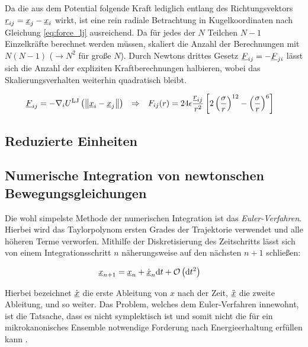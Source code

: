 		Da die aus dem Potential folgende Kraft lediglich entlang des Richtungsvektors
		$\underline{r}_{ij} = \underline{x}_j - \underline{x}_i$ wirkt, ist eine rein radiale Betrachtung in
		Kugelkoordinaten nach Gleichung \eqref{eq:force_lj} ausreichend. Da für jedes der $N$
		Teilchen $N-1$ Einzelkräfte berechnet werden müssen, skaliert die Anzahl der Berechnungen
		mit $N(N-1)$ ($\rightarrow N^2$ für große $N$). Durch Newtons drittes Gesetz
		$\underline{F}_{ij} = -\underline{F}_{ji}$ lässt sich die Anzahl der expliziten Kraftberechnungen
		halbieren, wobei das Skalierungsverhalten weiterhin quadratisch bleibt.

		\begin{align}
			\underline{F}_{ij} &= -\nabla_i U^\text{LJ}\left(
				\left\|\underline{x}_i - \underline{x}_j\right\|
			\right) \nonumber
			&\Rightarrow&&
			F_{ij}(r) &= 24\epsilon \frac{\underline{r}_{ij}}{r^2} \left[
				2\left(\frac{\sigma}{r}\right)^{12}
				-
				\left(\frac{\sigma}{r}\right)^{6}
			\right] \label{eq:force_lj}
		\end{align}

	\subsection{Reduzierte Einheiten}

	\subsection{Numerische Integration von newtonschen Bewegungsgleichungen}
		Die wohl simpelste Methode der numerischen Integration ist das \emph{Euler-Verfahren}.
		Hierbei wird das Taylorpolynom ersten Grades der Trajektorie verwendet und alle höheren
		Terme verworfen. Mithilfe der Diskretisierung des Zeitschritts \dt lässt sich von einem
		Integrationsschritt $n$ näherungsweise auf den nächsten $n+1$ schließen:

		\begin{align}
			\underline{x}_{n+1} &= \underline{x}_n + \dot{\underline{x}}_n \text{d} t + \operatorname{\mathcal{O}}\left(\text{d} t^2\right)
		\end{align}

		Hierbei bezeichnet $\dot{\underline{x}}$ die erste Ableitung von $x$ nach der Zeit,
		$\ddot{\underline{x}}$ die zweite Ableitung, und so weiter. Das Problem, welches dem
		Euler-Verfahren innewohnt, ist die Tatsache, dass es nicht symplektisch ist und somit
		nicht die für ein mikrokanonisches Ensemble notwendige Forderung nach Energieerhaltung
		erfüllen kann \cite[S. 6f]{klein2013klassische}.

